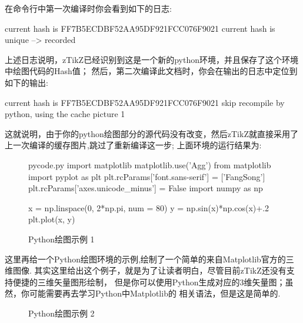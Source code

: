 在命令行中第一次编译时你会看到如下的日志:
\begin{codeprint}
current hash is FF7B5ECDBF52AA95DF921FCC076F9021
current hash is unique --> recorded
\end{codeprint}

上述日志说明，zTikZ已经识别到这是一个新的python环境，并且保存了这个环境中绘图代码的Hash值；
然后，第二次编译此文档时，你会在输出的日志中定位到如下的输出:
\begin{codeprint}
current hash is FF7B5ECDBF52AA95DF921FCC076F9021
skip recompile by python, using the cache picture 1
\end{codeprint}

这就说明，由于你的python绘图部分的源代码没有改变，然后zTikZ就直接采用了上一次编译的缓存图片,跳过了重新编译这一步;
上面环境的运行结果为:

\begin{figure}[!htb]
    \centering
\begin{pyfig}[width=.75\linewidth]{pycode.py}
import matplotlib 
matplotlib.use('Agg')
from matplotlib import pyplot as plt
plt.rcParams['font.sans-serif'] = ['FangSong']  
plt.rcParams['axes.unicode_minus'] = False
import numpy as np

x = np.linspace(0, 2*np.pi, num = 80)
y = np.sin(x)*np.cos(x)+.2
plt.plot(x, y)
\end{pyfig}
    \caption{Python绘图示例 1}
    \label{fig:py-fig-1}
\end{figure}

这里再给一个Python绘图环境的示例,绘制了一个简单的来自Matplotlib官方的三维图像. 
其实这里给出这个例子，就是为了让读者明白，尽管目前zTikZ还没有支持便捷的三维矢量图形绘制，
但是你可以使用Python生成对应的3维矢量图；虽然，你可能需要再去学习Python中Matplotlib的
相关语法，但是这是简单的.

\begin{figure}[!htb]
    \centering
    
    \caption{Python绘图示例 2}
    \label{fig:py-fig-2}
\end{figure}

